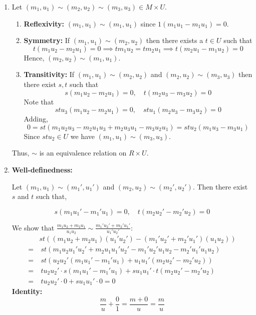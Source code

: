 \documentclass[Notebook.tex]{subfiles}
\begin{document}
\begin{solution}
	\bbni 
	\begin{enumerate}
		\item  Let $(m_1, u_1) \sim (m_2, u_2) \sim (m_3, u_3) \in M \times U$. 
		
		\begin{enumerate}
			\item \textbf{Reflexivity:} $(m_1, u_1) \sim (m_1, u_1)$ since $1(m_1u_1 - m_1u_1) = 0$. 
			\item \textbf{Symmetry:} If $(m_1, u_1) \sim (m_2, u_2)$ then there exists a $t \in U$ such that 
			\[t(m_1u_2 - m_2u_1) = 0 \implies tm_1u_2 = tm_2u_1 \implies t(m_2u_1 - m_1u_2) = 0\]
			Hence, $(m_2, u_2) \sim (m_1, u_1)$.  

			\item \textbf{Transitivity:} If $(m_1, u_1) \sim (m_2, u_2)$ and $(m_2, u_2) \sim (m_3, u_3)$ then there exist $s, t$ such that 
			\[s(m_1u_2 - m_2u_1) = 0, \quad t(m_2u_3 - m_3u_2) = 0\]
			Note that 
			\[stu_3(m_1u_2 - m_2u_1) = 0, \quad stu_1(m_2u_3 - m_3u_2) = 0\]
			Adding, 
			\[0 = st(m_1u_2u_3 - m_2u_1u_3 + m_2u_3u_1 - m_3u_2u_1) = stu_2(m_1u_3 - m_3u_1)\]
			Since $stu_2 \in U$ we have $(m_1, u_1) \sim (m_3, u_3)$.  
		\end{enumerate}
		Thus, $\sim$ is an equivalence relation on $R \times U$. 

		\item \textbf{Well-definedness:}
		
		Let $(m_1, u_1) \sim (m_1', u_1')$ and $(m_2, u_2) \sim (m_2', u_2')$. Then there exist $s$ and $t$ such that, 
		
		\[s(m_1u_1' - m_1'u_1) = 0, \quad t(m_2u_2' - m_2'u_2) = 0\]
		
		We show that $\frac{m_1u_2 + m_2u_1}{u_1u_2} \sim \frac{m_1'u_2' + m_2'u_1'}{u_1'u_2'}$: 
		\begin{align*}
			&st\left((m_1u_2 + m_2u_1)(u_1'u_2') - (m_1'u_2' + m_2'u_1')(u_1u_2)\right) \\
			= &\ st\left(m_1u_2u_1'u_2' + m_2u_1u_1'u_2' - m_1'u_2'u_1u_2 - m_2'u_1'u_1u_2\right) \\
			= &\ st\left(u_2u_2'(m_1u_1' - m_1'u_1) + u_1u_1'(m_2u_2' - m_2'u_2)\right) \\
			= &\ tu_2u_2' \cdot s(m_1u_1' - m_1'u_1) + su_1u_1' \cdot t(m_2u_2' - m_2'u_2) \\
			= &\ tu_2u_2' \cdot 0 + su_1u_1' \cdot 0 = 0
		\end{align*}
		\textbf{Identity:} 
			\[\frac{m}{u} + \frac{0}{1} = \frac{m + 0}{u} = \frac{m}{u}\]


\end{enumerate}
\end{solution}
\end{document}
